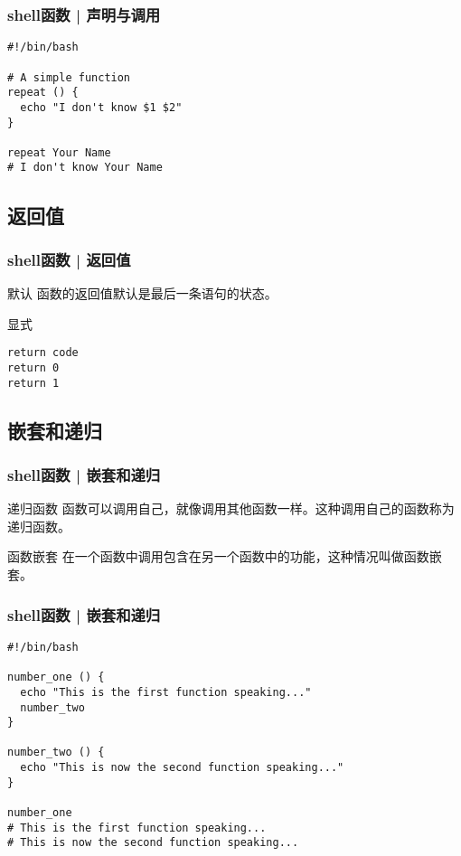 \begin{frame}[fragile]
  \frametitle{shell函数 | 声明与调用}
\begin{lstlisting}
#!/bin/bash

# A simple function
repeat () {
  echo "I don't know $1 $2"
}

repeat Your Name
# I don't know Your Name
\end{lstlisting}
\end{frame}

\subsection{返回值}
\begin{frame}[fragile]
  \frametitle{shell函数 | \alert{返回值}}
  \begin{block}{默认}
    函数的返回值默认是最后一条语句的状态。
  \end{block}
  \pause
  \begin{block}{显式}
\begin{lstlisting}
return code
return 0
return 1
\end{lstlisting}
  \end{block}
\end{frame}

\subsection{嵌套和递归}
\begin{frame}[fragile]
  \frametitle{shell函数 | 嵌套和递归}
  \begin{block}{递归函数}
  函数可以调用自己，就像调用其他函数一样。这种调用自己的函数称为递归函数。
  \end{block}
  \pause
  \begin{block}{函数嵌套}
  在一个函数中调用包含在另一个函数中的功能，这种情况叫做函数嵌套。
  \end{block}
\end{frame}

\begin{frame}[fragile]
  \frametitle{shell函数 | 嵌套和递归}
\begin{lstlisting}
#!/bin/bash

number_one () {
  echo "This is the first function speaking..."
  number_two
}

number_two () {
  echo "This is now the second function speaking..."
}

number_one
# This is the first function speaking...
# This is now the second function speaking...
\end{lstlisting}
\end{frame}


